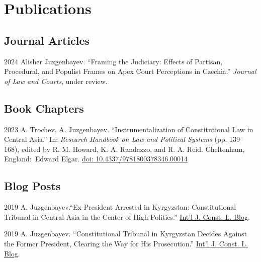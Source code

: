 \documentclass[11pt,letterpaper]{report}
\begin{document}
    \section*{Publications}

   \subsection*{Journal Articles}

   \begin{tablist}

       

        \item[2024] \tab{}Alisher Juzgenbayev. \enquote{Framing the Judiciary: Effects of Partisan, Procedural, and Populist Frames on Apex Court Perceptions in Czechia.} \textit{Journal of Law and Courts}, under review.

      

    \end{tablist}



    \subsection*{Book Chapters}

    \begin{tablist}

        \item[2023] \tab{}A. Trochev, A. Juzgenbayev. \enquote{Instrumentalization of Constitutional Law in Central Asia.} In: \textit{Research Handbook on Law and Political Systems} (pp. 139--168), edited by R. M. Howard, K. A. Randazzo, and  R. A. Reid. Cheltenham, England:\ Edward Elgar. \href{https://doi.org/10.4337/9781800378346.00014}{doi: 10.4337/9781800378346.00014}

    \end{tablist}

    \subsection*{Blog Posts}

    \begin{tablist}
        
        \item[2019] \tab{}A. Juzgenbayev.\enquote{Ex-President Arrested in Kyrgyzstan: Constitutional Tribunal in Central Asia in the Center of High Politics.} \href{http://www.iconnectblog.com/2019/08/ex-president-arrested-in-kyrgyzstan-constitutional-tribunal-in-central-asia-in-the-center-of-high-politics/}{Int’l J. Const. L. Blog}. 
        \item[2019] \tab{}A. Juzgenbayev. \enquote{Constitutional Tribunal in Kyrgyzstan Decides Against the Former President, Clearing the Way for His Prosecution.} \href{http://www.iconnectblog.com/2019/11/constitutional-tribunal-in-kyrgyzstan-decides-against-the-former-president-clearing-the-way-for-his-prosecution/}{Int’l J. Const. L. Blog}.
    \end{tablist}
\end{document}
